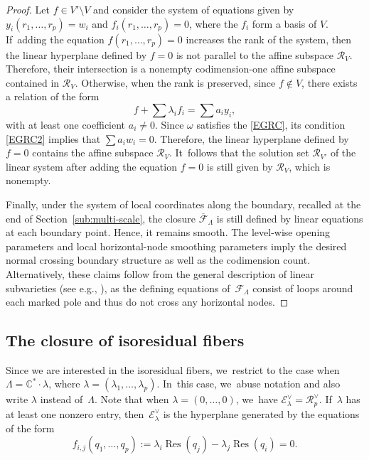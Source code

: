 \documentclass[JEP,XML,SOM,Unicode,NoFloatCountersInSection,published]{cedram}
\newcommand\calR{{\mathcal R}}
\DeclareMathOperator\Res{Res}
\theoremstyle{definition}
\begin{document}
\begin{proof}
Let $f\!\in\! V'\setminus V$ and consider the system of equations given by \hbox{$y_{i}(r_1,\ldots, r_p)=w_{i}$} and $f_{i}(r_1,\ldots, r_p)=0$, where the $f_{i}$ form a basis of $V$. If~adding the equation $f(r_1,\ldots, r_p)=0$ increases the rank of the system, then the linear hyperplane defined by $f = 0$ is not parallel to the affine subspace $\calR_V$. Therefore, their intersection is a nonempty codimension-one affine subspace contained in $\calR_{V}$. Otherwise, \ie when the rank is preserved, since $f\notin V$, there exists a relation of the form
\[
f+\sum \lambda_{i}f_{i} = \sum a_{i}y_{i},
\]
with at least one coefficient $a_{i}\neq 0$.
Since $\omega$ satisfies the \ref{EGRC}, its condition \eqref{EGRC2} implies that
$\sum a_{i} w_{i}=0$. Therefore, the linear hyperplane defined by $f = 0$ contains the affine subspace $\calR_V$. It~follows that
the solution set $\calR_{V'}$ of the linear system after adding the equation $f = 0$ is still given by $\calR_{V}$, which is nonempty.

Finally, under the system of local coordinates along the boundary, recalled at the end of Section~\ref{sub:multi-scale}, the closure $\overline{\mathcal{F}}_{\Lambda}$ is still defined by linear equations at each boundary point. Hence, it remains smooth. The level-wise opening parameters and local horizontal-node smoothing parameters imply the desired normal crossing boundary structure as well as the codimension count. Alternatively, these claims follow from the general description of linear subvarieties (see e.g., \cite[Cor.\,1.8]{BDG}), as the defining equations of~$\mathcal F_\Lambda$ consist of loops around each marked pole and thus do not cross any horizontal nodes.
\end{proof}

\subsection{The closure of isoresidual fibers}\label{sub:isoclosure}

Since we are interested in the isoresidual fibers, we~restrict to the case when $\Lambda = \mathbb{C}^{\ast} \cdot \lambda$, where $\lambda = (\lambda_1,\ldots, \lambda_p)$. In~this case, we~abuse notation and also write $\lambda$ instead of~$\Lambda$.
Note that when $\lambda=(0,\dots,0)$, we~have $\mathcal{E}_{\lambda}^{\vee}=\mathcal{R}_{p}^{\vee}$. If~$\lambda$ has at least one nonzero entry, then~$\mathcal{E}_{\lambda}^{\vee}$ is the hyperplane generated by the equations of the form
\begin{equation}\label{eq:relres}
f_{i,j}(q_{1},\dots,q_{p}):=\lambda_{i}\Res(q_{j})-\lambda_{j}\Res(q_{i})=0.
\end{equation}
\end{document}
